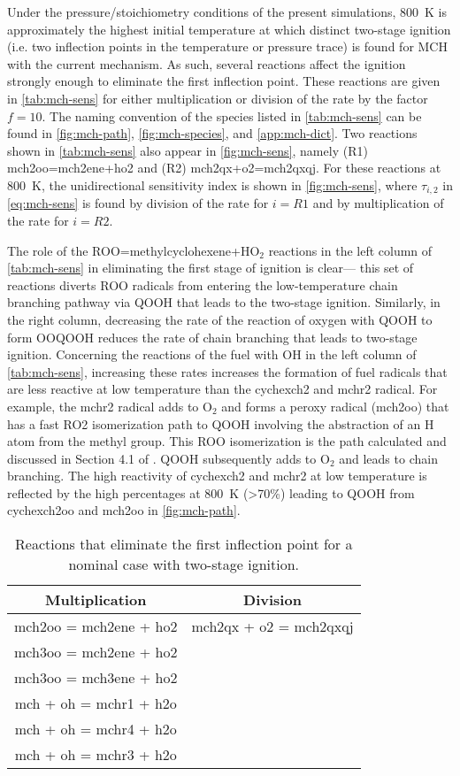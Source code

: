 \documentclass[12pt, letterpaper]{article}
\begin{document}
Under the pressure/stoichiometry conditions of the present simulations, \SI{800}{\kelvin}
is approximately the highest initial temperature at which distinct two-stage
ignition (i.e. two inflection points in the temperature or pressure trace) is
found for MCH with the current mechanism. As such, several reactions affect
the ignition strongly enough to eliminate the first inflection point. These
reactions are given in \autoref{tab:mch-sens} for either multiplication or
division of the rate by the factor $f=10$. The naming convention of the species
listed in \autoref{tab:mch-sens} can be found in \autoref{fig:mch-path},
\autoref{fig:mch-species}, and \autoref{app:mch-dict}. Two reactions shown in
\autoref{tab:mch-sens} also appear in \autoref{fig:mch-sens}, namely (R1)
mch2oo=mch2ene+ho2 and (R2) mch2qx+o2=mch2qxqj. For these reactions at \SI{800}{\kelvin},
the unidirectional sensitivity index is shown in \autoref{fig:mch-sens}, where $\tau_{i,2}$
in \autoref{eq:mch-sens} is found by division of the rate for $i=R1$ and by
multiplication of the rate for $i=R2$.

The role of the ROO=methylcyclohexene+HO$_2$ reactions in the left column of
\autoref{tab:mch-sens} in eliminating the first stage of ignition is clear---%
this set of reactions diverts ROO radicals from entering the low-temperature
chain branching pathway via QOOH that leads to the two-stage ignition.
Similarly, in the right column, decreasing the rate of the reaction of oxygen
with QOOH to form OOQOOH reduces the rate of chain branching that leads to
two-stage ignition. Concerning the reactions of the fuel with OH in the left
column of \autoref{tab:mch-sens}, increasing these rates increases the
formation of fuel radicals that are less reactive at low temperature than the
cychexch2 and mchr2 radical. For example, the mchr2 radical adds to O$_2$ and
forms a peroxy radical (mch2oo) that has a fast RO2 isomerization path to QOOH
involving the abstraction of an H atom from the methyl group. This ROO
isomerization is the path calculated and discussed in Section 4.1 of
\cite{Weber2014}. QOOH subsequently adds to O$_2$ and leads to chain branching.
The high reactivity of cychexch2 and mchr2 at low temperature is reflected by
the high percentages at \SI{800}{\kelvin} (>70\%) leading to QOOH from cychexch2oo and
mch2oo in \autoref{fig:mch-path}.

\begin{table}
    \caption{Reactions that eliminate the first inflection point for a nominal
    case with two-stage ignition.}
    \label{tab:mch-sens}
    \begin{tabular}{c c}
    \toprule
    Multiplication & Division \\
    \midrule
    mch2oo = mch2ene + ho2 & mch2qx + o2 = mch2qxqj \\
    mch3oo = mch2ene + ho2 & \\
    mch3oo = mch3ene + ho2 & \\
    mch + oh = mchr1 + h2o & \\
    mch + oh = mchr4 + h2o & \\
    mch + oh = mchr3 + h2o & \\
    \bottomrule
    \end{tabular}
\end{table}
\end{document}

